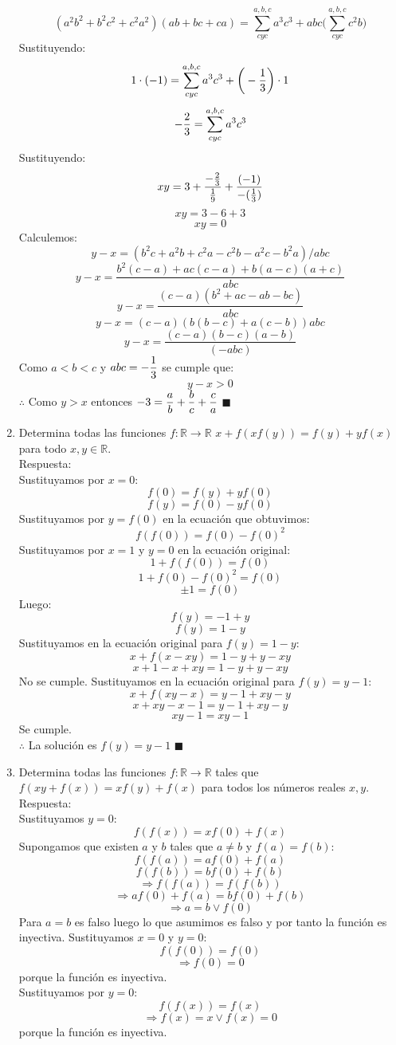 \documentclass{book}
\newcommand{\R}{\mathbb{R}} \newcommand{\N}{\mathbb{N}}
\begin{document}
\begin{enumerate}
$$(a^2 b^2+b^2 c^2+c^2 a^2 )(ab+bc+ca)=\sum_{cyc}^{a,b,c}a^3 c^3+abc\bigg(\sum_{cyc}^{a,b,c}c^2  b \bigg)$$
Sustituyendo:
$$1\cdot(-1)=\sum_{cyc}^{a,b,c}a^3 c^3 +\bigg(-{1\over 3}\bigg)\cdot 1$$
$$-{2\over 3}=\sum_{cyc}^{a,b,c}a^3 c^3$$
Sustituyendo:
$$xy=3+\frac{-{2\over 3}}{{1\over 9}}+{(-1)\over-({1\over 3})}$$
$$xy=3-6+3$$
$$xy=0$$
 Calculemos:
$$y-x=(b^2 c+a^2 b+c^2 a-c^2 b-a^2 c-b^2 a)/abc$$
$$y-x=\frac{b^2 (c-a)+ac(c-a)+b(a-c)(a+c)}{abc}$$
$$y-x=\frac{(c-a)(b^2+ac-ab-bc)}{abc}$$
$$y-x={(c-a)(b(b-c)+a(c-b))}{abc}$$
$$y-x=\frac{(c-a)(b-c)(a-b)}{(-abc)}$$
Como $a<b<c$ y  $\displaystyle{abc=-{1\over 3}}$ se cumple que:
$$y-x>0$$
$\therefore$ Como $y>x$ entonces $\displaystyle{-3={a\over b}+{b\over c}+{c\over a}}$ $\blacksquare$\\
				\item Determina todas las funciones $f:\R\rightarrow\R$ $x + f(xf(y))=f(y) + yf(x)$ para todo $x,y\in\R$.\\
				Respuesta:\\
				Sustituyamos por $x=0$:
 $$f(0) = f(y)+ yf(0)$$
$$f(y)=f(0)- yf(0)$$
Sustituyamos por $y=f(0)$ en la ecuación que obtuvimos:
$$f(f(0))=f(0)-{f(0)}^2$$
Sustituyamos por $x=1$ y $y=0$ en la ecuación original:
$$1+ f(f(0)) = f(0)$$
$$1+ f(0)-{f(0)}^2= f(0)$$
$$\pm 1= f(0)$$
Luego:
$$f(y)=-1+ y$$
$$f(y)=1- y$$
Sustituyamos en la ecuación original para $f(y)=1- y$:
$$x+ f(x-xy)= 1-y+y-xy$$
$$x+1-x+xy= 1-y+y-xy$$
No se cumple.
Sustituyamos en la ecuación original para $f(y)=y- 1$:
$$x+ f(xy-x)= y-1+xy-y$$
$$x+xy-x-1= y-1+xy-y$$
$$xy-1=xy-1$$
Se cumple.\\
$\therefore$ La solución es $f(y)=y-1 $ $\blacksquare$\\
				\item Determina todas las funciones $f:\R\rightarrow\R$ tales que $f(xy + f(x)) = xf(y) + f(x)$ para todos los números reales $x,y$.\\
				Respuesta:\\
				Sustituyamos $y=0$:
$$f( f(x)) = xf(0)+ f(x)$$
Supongamos que existen $a$ y $b$ tales que $a\neq b$ y $f(a)=f(b)$:
$$f( f(a)) = af(0)+ f(a)$$
$$f( f(b)) = bf(0)+ f(b)$$
$$\Rightarrow f( f(a))=f( f(b))$$
$$\Rightarrow af(0)+ f(a)=bf(0)+ f(b)$$
$$\Rightarrow a=b \vee f(0)$$
Para $a=b$ es falso luego lo que asumimos es falso y por tanto la función es inyectiva.
Sustituyamos $x=0$ y $y=0$:
$$f( f(0)) = f(0)$$
$$\Rightarrow f(0)=0$$
porque la función es inyectiva.\\
Sustituyamos por $y=0$:
$$f( f(x))= f(x)$$
$$\Rightarrow f(x)=x \vee f(x)=0$$
porque la función es inyectiva.\\

\end{enumerate}
\end{document}
